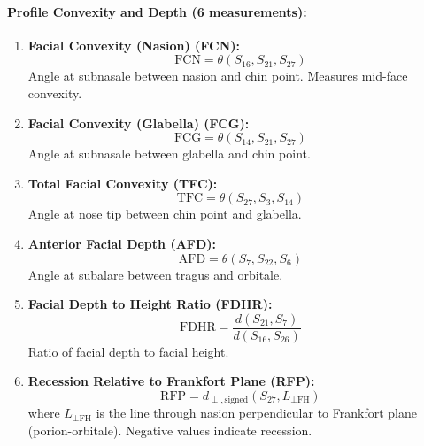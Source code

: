 \paragraph{Profile Convexity and Depth (6 measurements):}
\begin{enumerate}[resume]
    \item \textbf{Facial Convexity (Nasion) (FCN):}
    \begin{equation}
    \text{FCN} = \theta(S_{16}, S_{21}, S_{27})
    \end{equation}
    Angle at subnasale between nasion and chin point. Measures mid-face convexity.
    
    \item \textbf{Facial Convexity (Glabella) (FCG):}
    \begin{equation}
    \text{FCG} = \theta(S_{14}, S_{21}, S_{27})
    \end{equation}
    Angle at subnasale between glabella and chin point.
    
    \item \textbf{Total Facial Convexity (TFC):}
    \begin{equation}
    \text{TFC} = \theta(S_{27}, S_3, S_{14})
    \end{equation}
    Angle at nose tip between chin point and glabella.
    
    \item \textbf{Anterior Facial Depth (AFD):}
    \begin{equation}
    \text{AFD} = \theta(S_7, S_{22}, S_6)
    \end{equation}
    Angle at subalare between tragus and orbitale.
    
    \item \textbf{Facial Depth to Height Ratio (FDHR):}
    \begin{equation}
    \text{FDHR} = \frac{d(S_{21}, S_7)}{d(S_{16}, S_{26})}
    \end{equation}
    Ratio of facial depth to facial height.
    
    \item \textbf{Recession Relative to Frankfort Plane (RFP):}
    \begin{equation}
    \text{RFP} = d_{\perp,\text{signed}}(S_{27}, L_{\perp\text{FH}})
    \end{equation}
    where $L_{\perp\text{FH}}$ is the line through nasion perpendicular to Frankfort plane (porion-orbitale). Negative values indicate recession.
\end{enumerate}

